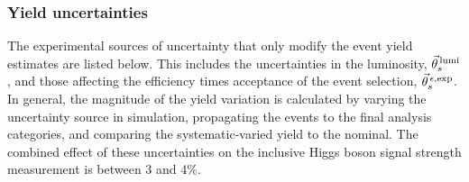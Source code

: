\subsubsection{Yield uncertainties}
The experimental sources of uncertainty that only modify the event yield estimates are listed below. This includes the uncertainties in the luminosity, $\vec{\theta}^{\,\rm{lumi}}_{s}$, and those affecting the efficiency times acceptance of the event selection, $\vec{\theta}^{\,\epsilon,{\rm{exp}}}_{s}$. In general, the magnitude of the yield variation is calculated by varying the uncertainty source in simulation, propagating the events to the final analysis categories, and comparing the systematic-varied yield to the nominal. The combined effect of these uncertainties on the inclusive Higgs boson signal strength measurement is between 3 and 4\%.

